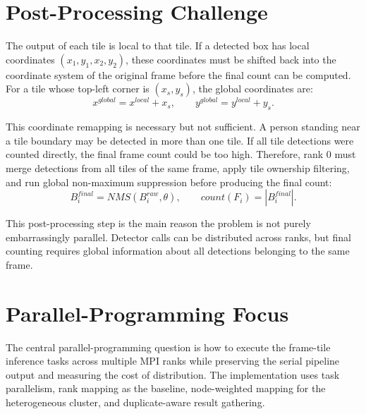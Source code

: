 \section{Post-Processing Challenge}
The output of each tile is local to that tile. If a detected box has local coordinates \((x_1,y_1,x_2,y_2)\), these coordinates must be shifted back into the coordinate system of the original frame before the final count can be computed. For a tile whose top-left corner is \((x_s,y_s)\), the global coordinates are:
\begin{equation}
    x^{global} = x^{local} + x_s, \qquad
    y^{global} = y^{local} + y_s.
\end{equation}

This coordinate remapping is necessary but not sufficient. A person standing near a tile boundary may be detected in more than one tile. If all tile detections were counted directly, the final frame count could be too high. Therefore, rank 0 must merge detections from all tiles of the same frame, apply tile ownership filtering, and run global non-maximum suppression before producing the final count:
\begin{equation}
    B_i^{final} = NMS(B_i^{raw}, \theta), \qquad count(F_i)=|B_i^{final}|.
\end{equation}

This post-processing step is the main reason the problem is not purely embarrassingly parallel. Detector calls can be distributed across ranks, but final counting requires global information about all detections belonging to the same frame.

\section{Parallel-Programming Focus}
The central parallel-programming question is how to execute the frame-tile inference tasks across multiple MPI ranks while preserving the serial pipeline output and measuring the cost of distribution. The implementation uses task parallelism, rank mapping as the baseline, node-weighted mapping for the heterogeneous cluster, and duplicate-aware result gathering.

